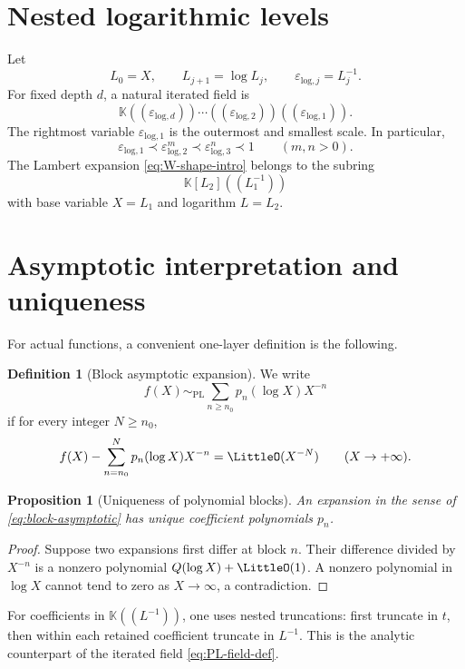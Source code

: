 \documentclass[11pt,oneside]{book}
\newtheorem{proposition}[theorem]{Proposition}
\theoremstyle{definition}
\newtheorem{definition}[theorem]{Definition}
\theoremstyle{remark}
\newcommand{\K}{\mathbb K}
\newcommand{\PolynomialLogAsymptotic}{\mathrel{\sim_{\mathrm{PL}}}}
\newcommand{\precdom}{\prec}
\newcommand{\InverseLogScale}[1]{\varepsilon_{\mathrm{log},#1}}
\begin{document}
\section{Nested logarithmic levels}
Let
\[
 L_0=X,\qquad L_{j+1}=\log L_j,
 \qquad \InverseLogScale{j}=L_j^{-1}.
\]
For fixed depth $d$, a natural iterated field is
\begin{equation}\label{eq:nested-field}
 \K((\InverseLogScale{d}))\cdots
 ((\InverseLogScale{2}))((\InverseLogScale{1})).
\end{equation}
The rightmost variable $\InverseLogScale{1}$ is the outermost and smallest
scale.  In
particular,
\[
 \InverseLogScale{1}\precdom \InverseLogScale{2}^m
 \precdom\InverseLogScale{3}^n\precdom1
 \qquad(m,n>0).
\]
The Lambert expansion \eqref{eq:W-shape-intro} belongs to the subring
\[
 \K[L_2]((L_1^{-1}))
\]
with base variable $X=L_1$ and logarithm $L=L_2$.

\section{Asymptotic interpretation and uniqueness}
For actual functions, a convenient one-layer definition is the following.

\begin{definition}[Block asymptotic expansion]
We write
\begin{equation}\label{eq:block-asymptotic}
 f(X)\PolynomialLogAsymptotic
 \sum_{n\ge n_0}p_n(\log X)X^{-n}
\end{equation}
if for every integer $N\ge n_0$,
\[
 f(X)-\sum_{n=n_0}^{N}p_n(\log X)X^{-n}=\LittleO(X^{-N})
 \qquad(X\to+\infty).
\]
\end{definition}

\begin{proposition}[Uniqueness of polynomial blocks]
An expansion in the sense of \eqref{eq:block-asymptotic} has unique
coefficient polynomials $p_n$.
\end{proposition}
\begin{proof}
Suppose two expansions first differ at block $n$.  Their difference divided by
$X^{-n}$ is a nonzero polynomial $Q(\log X)+\LittleO(1)$.  A nonzero polynomial in
$\log X$ cannot tend to zero as $X\to\infty$, a contradiction.
\end{proof}

For coefficients in $\K((L^{-1}))$, one uses nested truncations: first truncate
in $t$, then within each retained coefficient truncate in $L^{-1}$.  This is
the analytic counterpart of the iterated field \eqref{eq:PL-field-def}.
\end{document}
